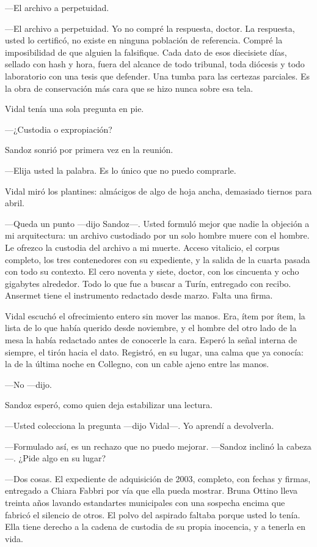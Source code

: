 ---El archivo a perpetuidad.

---El archivo a perpetuidad. Yo no compré la respuesta, doctor. La respuesta, usted lo certificó, no existe en ninguna población de referencia. Compré la imposibilidad de que alguien la falsifique. Cada dato de esos diecisiete días, sellado con hash y hora, fuera del alcance de todo tribunal, toda diócesis y todo laboratorio con una tesis que defender. Una tumba para las certezas parciales. Es la obra de conservación más cara que se hizo nunca sobre esa tela.

Vidal tenía una sola pregunta en pie.

---¿Custodia o expropiación?

Sandoz sonrió por primera vez en la reunión.

---Elija usted la palabra. Es lo único que no puedo comprarle.

Vidal miró los plantines: almácigos de algo de hoja ancha, demasiado tiernos para abril.

---Queda un punto ---dijo Sandoz---. Usted formuló mejor que nadie la objeción a mi arquitectura: un archivo custodiado por un solo hombre muere con el hombre. Le ofrezco la custodia del archivo a mi muerte. Acceso vitalicio, el corpus completo, los tres contenedores con su expediente, y la salida de la cuarta pasada con todo su contexto. El cero noventa y siete, doctor, con los cincuenta y ocho gigabytes alrededor. Todo lo que fue a buscar a Turín, entregado con recibo. Ansermet tiene el instrumento redactado desde marzo. Falta una firma.

Vidal escuchó el ofrecimiento entero sin mover las manos. Era, ítem por ítem, la lista de lo que había querido desde noviembre, y el hombre del otro lado de la mesa la había redactado antes de conocerle la cara. Esperó la señal interna de siempre, el tirón hacia el dato. Registró, en su lugar, una calma que ya conocía: la de la última noche en Collegno, con un cable ajeno entre las manos.

---No ---dijo.

Sandoz esperó, como quien deja estabilizar una lectura.

---Usted colecciona la pregunta ---dijo Vidal---. Yo aprendí a devolverla.

---Formulado así, es un rechazo que no puedo mejorar. ---Sandoz inclinó la cabeza---. ¿Pide algo en su lugar?

---Dos cosas. El expediente de adquisición de 2003, completo, con fechas y firmas, entregado a Chiara Fabbri por vía que ella pueda mostrar. Bruna Ottino lleva treinta años lavando estandartes municipales con una sospecha encima que fabricó el silencio de otros. El polvo del aspirado faltaba porque usted lo tenía. Ella tiene derecho a la cadena de custodia de su propia inocencia, y a tenerla en vida.

